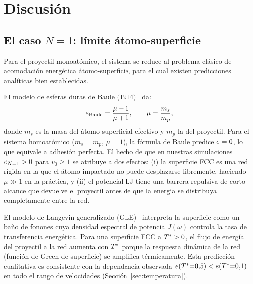 \section{Discusión}
\label{sec:discusion}

\subsection{El caso \texorpdfstring{$N=1$}{N=1}: límite átomo-superficie}
\label{sec:limite_n1}

Para el proyectil monoatómico, el sistema se reduce al problema clásico de
acomodación energética átomo-superficie, para el cual existen predicciones
analíticas bien establecidas.

El modelo de esferas duras de Baule (1914)~\cite{baule1914} da:
\begin{equation}
    e_{\mathrm{Baule}} = \frac{\mu - 1}{\mu + 1},
    \qquad
    \mu = \frac{m_s}{m_p},
\end{equation}
donde $m_s$ es la masa del átomo superficial efectivo y $m_p$ la del
proyectil. Para el sistema homoatómico ($m_s = m_p$, $\mu=1$), la fórmula
de Baule predice $e=0$, lo que equivale a adhesión perfecta. El hecho de
que en nuestras simulaciones $e_{N=1} > 0$ para $v_0 \geq 1$ se atribuye
a dos efectos: (i) la superficie FCC es una red rígida en la que el átomo
impactado no puede desplazarse libremente, haciendo $\mu \gg 1$ en la práctica,
y (ii) el potencial LJ tiene una barrera repulsiva de corto alcance que devuelve
el proyectil antes de que la energía se distribuya completamente entre la red.

El modelo de Langevin generalizado (GLE)~\cite{tully1980,adelman1976} interpreta
la superficie como un baño de fonones cuya densidad espectral de potencia $J(\omega)$
controla la tasa de transferencia energética. Para una superficie FCC a $T^{*} > 0$,
el flujo de energía del proyectil a la red aumenta con $T^{*}$ porque la respuesta
dinámica de la red (función de Green de superficie) se amplifica térmicamente.
Esta predicción cualitativa es consistente con la dependencia observada
$e(T^{*}{=}0{,}5) < e(T^{*}{=}0{,}1)$ en todo el rango de velocidades
(Sección~\ref{sec:temperatura}).

